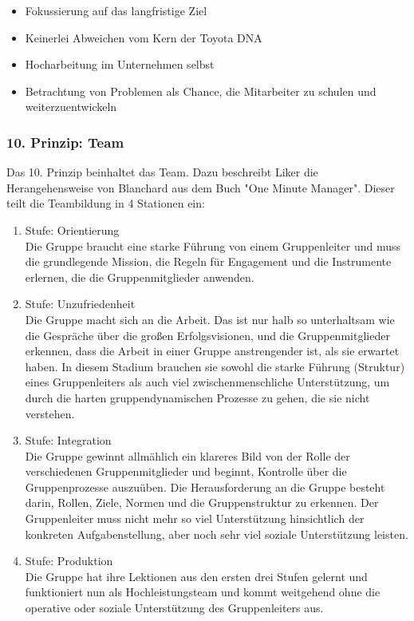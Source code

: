 \documentclass[a4paper,12pt]{scrartcl}
\begin{document}
\begin{itemize}
    \item Fokussierung auf das langfristige Ziel
    \item Keinerlei Abweichen vom Kern der Toyota DNA
    \item Hocharbeitung im Unternehmen selbst
    \item Betrachtung von Problemen als Chance, die Mitarbeiter zu schulen und weiterzuentwickeln
\end{itemize}

\subsubsection{10. Prinzip: Team}

Das 10. Prinzip beinhaltet das Team. Dazu beschreibt Liker die Herangehensweise von Blanchard aus dem Buch "One Minute Manager". Dieser teilt die Teambildung in 4 Stationen ein:

\begin{enumerate}
    \item Stufe: Orientierung \\
    Die Gruppe braucht eine starke Führung von einem Gruppenleiter und muss die grundlegende Mission, die Regeln für Engagement und die Instrumente erlernen, die die Gruppenmitglieder anwenden.
    \item Stufe: Unzufriedenheit \\
    Die Gruppe macht sich an die Arbeit. Das ist nur halb so unterhaltsam wie die Gespräche über die großen Erfolgsvisionen, und die Gruppenmitglieder erkennen, dass die Arbeit in einer Gruppe anstrengender ist, als sie erwartet haben. In diesem Stadium brauchen sie sowohl die starke Führung (Struktur) eines Gruppenleiters als auch viel zwischenmenschliche Unterstützung, um durch die harten gruppendynamischen Prozesse zu gehen, die sie nicht verstehen.
    \item Stufe: Integration \\
    Die Gruppe gewinnt allmählich ein klareres Bild von der Rolle der verschiedenen Gruppenmitglieder und beginnt, Kontrolle über die Gruppenprozesse auszuüben. Die Herausforderung an die Gruppe besteht darin, Rollen, Ziele, Normen und die Gruppenstruktur zu erkennen. Der Gruppenleiter muss nicht mehr so viel Unterstützung hinsichtlich der konkreten Aufgabenstellung, aber noch sehr viel soziale Unterstützung leisten.
    \item Stufe: Produktion\\
    Die Gruppe hat ihre Lektionen aus den ersten drei Stufen gelernt und funktioniert nun als Hochleistungsteam und kommt weitgehend ohne die operative oder soziale Unterstützung des Gruppenleiters aus.
\end{enumerate}
\end{document}
